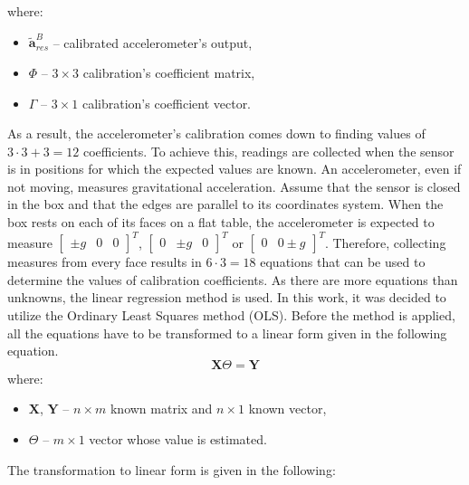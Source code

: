 where:
\begin{itemize}
	\item $\bm{\tilde{a}}_{res}^B$ -- calibrated accelerometer's output,
	\item $\bm{\varPhi}$ -- $3 \times 3$ calibration's coefficient matrix,
	\item $\bm{\varGamma}$ -- $3 \times 1$ calibration's coefficient vector.
\end{itemize}
As a result, the accelerometer’s calibration comes down to finding values of $3 \cdot 3 + 3 = 12$ coefficients. To achieve this, readings are collected when the sensor is in positions for which the expected values are known. An accelerometer, even if not moving, measures gravitational acceleration. Assume that the sensor is closed in the box and that the edges are parallel to its coordinates system. When the box rests on each of its faces on a flat table, the accelerometer is expected to measure $\begin{bmatrix}\pm g & 0 & 0\end{bmatrix}^T$, $\begin{bmatrix}0 & \pm g & 0\end{bmatrix}^T$ or $\begin{bmatrix} 0 & 0 \pm g\end{bmatrix}^T$. Therefore, collecting measures from every face results in $6 \cdot 3 = 18$ equations that can be used to determine the values of calibration coefficients. As there are more equations than unknowns, the linear regression method is used. In this work, it was decided to utilize the Ordinary Least Squares method (OLS). Before the method is applied, all the equations have to be transformed to a linear form given in the following equation.
\begin{equation}
	\bm{X} \bm{\varTheta} = \bm{Y}
	\label{ols}
\end{equation}
where:
\begin{itemize}[noitemsep]
	\item $\bm{X}$, $\bm{Y}$  -- $n \times m$ known matrix and $n \times 1$ known vector,
	\item $\bm{\varTheta}$ -- $m \times 1$ vector whose value is estimated.
\end{itemize}
 
The transformation to linear form is given in the following:
\setcounter{MaxMatrixCols}{25}


